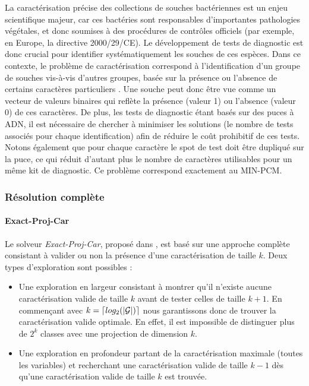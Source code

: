 La caractérisation précise des collections de souches bactériennes est un enjeu
scientifique majeur, car ces bactéries sont responsables d'importantes
pathologies végétales, et donc soumises à des procédures de contrôles officiels
(par exemple, en Europe, la directive 2000/29/CE). Le développement de tests de
diagnostic est donc crucial pour identifier systématiquement les
souches de ces espèces. Dans ce contexte, le problème de caractérisation
correspond à l'identification d'un groupe de souches vis-à-vis d'autres groupes,
basée sur la présence ou l'absence de certains caractères particuliers
\cite{plos}. Une souche peut donc être vue comme un vecteur de valeurs binaires
qui reflète la présence (valeur 1) ou l'absence (valeur 0) de ces caractères. De
plus, les tests de diagnostic étant basés sur des puces à ADN, il est nécessaire
de chercher à minimiser les solutions (le nombre de tests associés pour chaque
identification) afin de réduire le coût prohibitif de ces tests. Notons également que pour chaque caractère le spot de test doit être dupliqué sur la puce, ce qui réduit d'autant plus le nombre de caractères utilisables pour un même kit de diagnostic. Ce problème correspond exactement au MIN-PCM.

\subsubsection{Résolution complète}
\paragraph{Exact-Proj-Car}
Le solveur \emph{Exact-Proj-Car}, proposé dans \cite{sac12}, est basé sur une approche complète consistant à valider ou non la présence d'une caractérisation de taille $k$. Deux types d'exploration sont possibles :
\begin{itemize}
 \item Une exploration en largeur consistant à montrer qu'il n'existe aucune caractérisation valide de taille $k$ avant de tester celles de taille $k+1$. En commençant avec $k= \lceil
log_2(|\cal{G}|)\rceil$ nous garantissons donc de trouver la caractérisation valide optimale. En effet, il est impossible de distinguer plus de $2^k$ classes avec une projection de dimension $k$.
 \item Une exploration en profondeur partant de la caractérisation maximale (toutes les variables) et recherchant une caractérisation valide de taille $k-1$ dès qu'une caractérisation valide de taille $k$ est trouvée.
\end{itemize}

